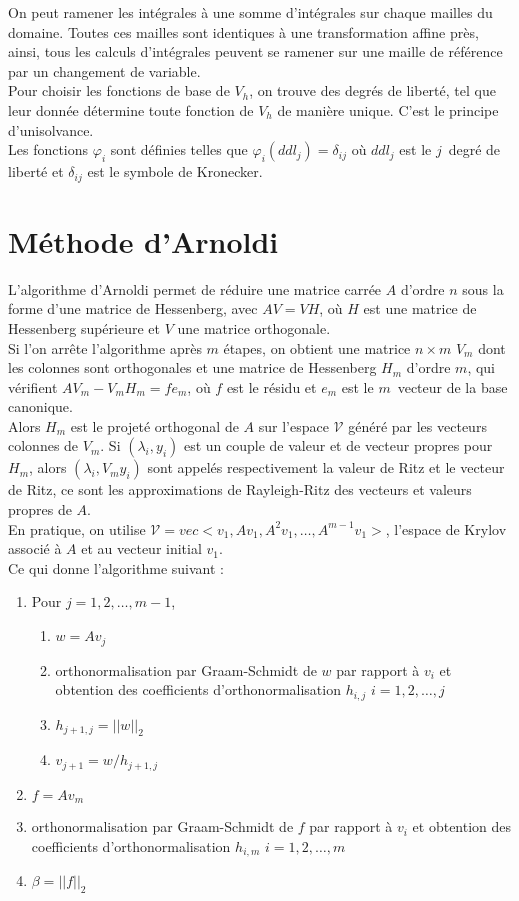 On peut ramener les intégrales à une somme d'intégrales sur chaque mailles du domaine. Toutes ces mailles sont identiques à une transformation affine près, ainsi, tous les calculs d'intégrales peuvent se ramener sur une maille de référence par un changement de variable.\\

Pour choisir les fonctions de base de $V_h$, on trouve des degrés de liberté, tel que leur donnée détermine toute fonction de $V_h$ de manière unique. C'est le principe d'unisolvance.\\
Les fonctions $\varphi_i$ sont  définies telles que $\varphi_i(ddl_j)=\delta_{ij}$ où $ddl_j$ est le $j$\ieme\ degré de liberté et $\delta_{ij}$ est le symbole de Kronecker.

\section{Méthode d'Arnoldi}
\label{arnoldi}
L'algorithme d'Arnoldi permet de réduire une matrice carrée $A$ d'ordre $n$ sous la forme d'une matrice de Hessenberg, avec $AV = VH$, où $H$ est une matrice de Hessenberg supérieure et $V$ une matrice orthogonale.\\
Si l'on arrête l'algorithme après $m$ étapes, on obtient une matrice $n\times m$ $V_m$ dont les colonnes sont orthogonales et une matrice de Hessenberg $H_m$ d'ordre $m$, qui vérifient $AV_m - V_mH_m = fe_m$, où $f$ est le résidu et $e_m$ est le $m$\ieme\ vecteur de la base canonique.\\
Alors $H_m$ est le projeté orthogonal de $A$ sur l'espace $\mathcal{V}$ généré par les vecteurs colonnes de $V_m$. Si $(\lambda_i, y_i)$ est un couple de valeur et de vecteur propres pour $H_m$, alors $(\lambda_i, V_my_i)$ sont appelés respectivement la valeur de Ritz et le vecteur de Ritz, ce sont les approximations de Rayleigh-Ritz des vecteurs et valeurs propres de $A$.\\
En pratique, on utilise $\mathcal{V}= vec<v_1, Av_1, A^2v_1,\dots,A^{m-1}v_1>$, l'espace de Krylov associé à $A$ et au vecteur initial $v_1$.\\

Ce qui donne l'algorithme suivant :
\begin{enumerate}
\item Pour $j=1,2,\dots,m-1$,
\begin{enumerate}
\item $w=Av_j$
\item orthonormalisation par Graam-Schmidt de $w$ par rapport à $v_i$ et obtention des coefficients d'orthonormalisation $h_{i,j}$ $i=1,2,\dots,j$
\item $h_{j+1,j}=||w||_2$
\item $v_{j+1}=w/h_{j+1,j}$
\end{enumerate}
\item $f=Av_m$
\item orthonormalisation par Graam-Schmidt de $f$ par rapport à $v_i$ et obtention des coefficients d'orthonormalisation $h_{i,m}$ $i=1,2,\dots,m$
\item $\beta=||f||_2$
\end{enumerate}

